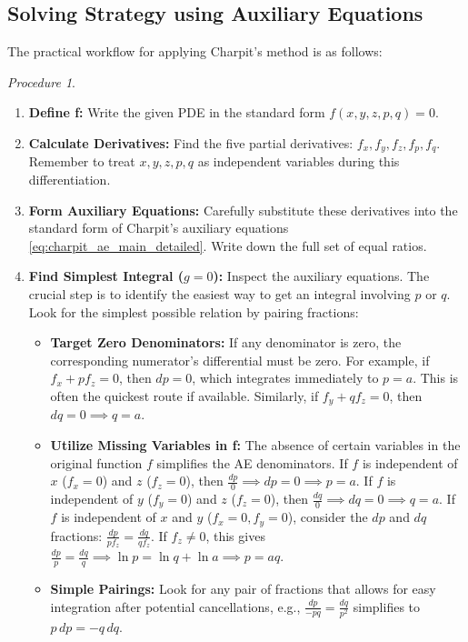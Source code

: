 \documentclass{article}
\theoremstyle{remark}
\newtheorem{procedure}{Procedure}[subsection] %
\begin{document}
	\subsection{Solving Strategy using Auxiliary Equations}
	The practical workflow for applying Charpit's method is as follows:
	\begin{procedure}
		\begin{enumerate}
			\item \textbf{Define f:} Write the given PDE in the standard form $f(x, y, z, p, q) = 0$.
			\item \textbf{Calculate Derivatives:} Find the five partial derivatives: $f_x, f_y, f_z, f_p, f_q$. Remember to treat $x, y, z, p, q$ as independent variables during this differentiation.
			\item \textbf{Form Auxiliary Equations:} Carefully substitute these derivatives into the standard form of Charpit's auxiliary equations \eqref{eq:charpit_ae_main_detailed}. Write down the full set of equal ratios.
			\item \textbf{Find Simplest Integral ($g=0$):} Inspect the auxiliary equations. The crucial step is to identify the easiest way to get an integral involving $p$ or $q$. Look for the simplest possible relation by pairing fractions:
			\begin{itemize}
				\item \textbf{Target Zero Denominators:} If any denominator is zero, the corresponding numerator's differential must be zero. For example, if $f_x + p f_z = 0$, then $dp = 0$, which integrates immediately to $p = a$. This is often the quickest route if available. Similarly, if $f_y + q f_z = 0$, then $dq = 0 \implies q = a$.
				\item \textbf{Utilize Missing Variables in f:} The absence of certain variables in the original function $f$ simplifies the AE denominators.
				\subitem If $f$ is independent of $x$ ($f_x=0$) and $z$ ($f_z=0$), then $\frac{dp}{0} \implies dp=0 \implies p=a$.
				\subitem If $f$ is independent of $y$ ($f_y=0$) and $z$ ($f_z=0$), then $\frac{dq}{0} \implies dq=0 \implies q=a$.
				\subitem If $f$ is independent of $x$ and $y$ ($f_x=0, f_y=0$), consider the $dp$ and $dq$ fractions: $\frac{dp}{p f_z} = \frac{dq}{q f_z}$. If $f_z \neq 0$, this gives $\frac{dp}{p} = \frac{dq}{q} \implies \ln p = \ln q + \ln a \implies p=aq$.
				\item \textbf{Simple Pairings:} Look for any pair of fractions that allows for easy integration after potential cancellations, e.g., $\frac{dp}{-pq} = \frac{dq}{p^2}$ simplifies to $p\,dp = -q\,dq$.

\end{itemize}
\end{enumerate}
\end{procedure}
\end{document}
